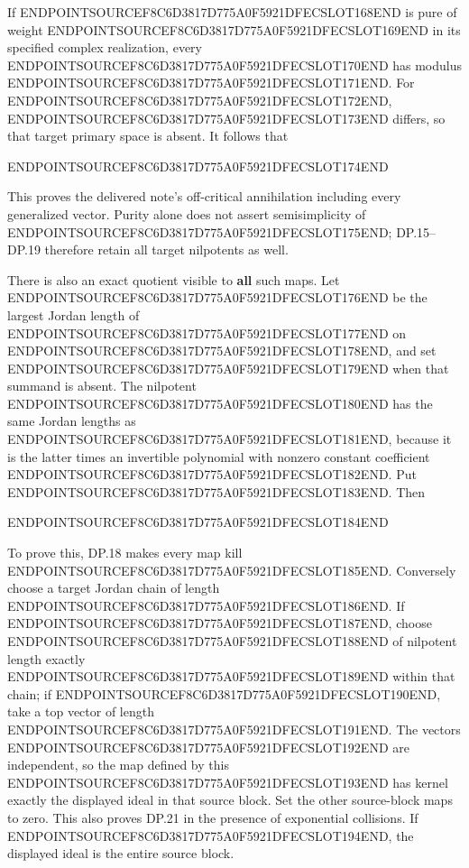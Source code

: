 If ENDPOINTSOURCEF8C6D3817D775A0F5921DFECSLOT168END is pure of weight ENDPOINTSOURCEF8C6D3817D775A0F5921DFECSLOT169END in its specified complex realization, every ENDPOINTSOURCEF8C6D3817D775A0F5921DFECSLOT170END has modulus ENDPOINTSOURCEF8C6D3817D775A0F5921DFECSLOT171END. For ENDPOINTSOURCEF8C6D3817D775A0F5921DFECSLOT172END, ENDPOINTSOURCEF8C6D3817D775A0F5921DFECSLOT173END differs, so that target primary space is absent. It follows that

ENDPOINTSOURCEF8C6D3817D775A0F5921DFECSLOT174END

This proves the delivered note's off-critical annihilation including every generalized vector. Purity alone does not assert semisimplicity of ENDPOINTSOURCEF8C6D3817D775A0F5921DFECSLOT175END; DP.15--DP.19 therefore retain all target nilpotents as well.

There is also an exact quotient visible to \textbf{all} such maps. Let ENDPOINTSOURCEF8C6D3817D775A0F5921DFECSLOT176END be the largest Jordan length of ENDPOINTSOURCEF8C6D3817D775A0F5921DFECSLOT177END on ENDPOINTSOURCEF8C6D3817D775A0F5921DFECSLOT178END, and set ENDPOINTSOURCEF8C6D3817D775A0F5921DFECSLOT179END when that summand is absent. The nilpotent ENDPOINTSOURCEF8C6D3817D775A0F5921DFECSLOT180END has the same Jordan lengths as ENDPOINTSOURCEF8C6D3817D775A0F5921DFECSLOT181END, because it is the latter times an invertible polynomial with nonzero constant coefficient ENDPOINTSOURCEF8C6D3817D775A0F5921DFECSLOT182END. Put ENDPOINTSOURCEF8C6D3817D775A0F5921DFECSLOT183END. Then

ENDPOINTSOURCEF8C6D3817D775A0F5921DFECSLOT184END

To prove this, DP.18 makes every map kill ENDPOINTSOURCEF8C6D3817D775A0F5921DFECSLOT185END. Conversely choose a target Jordan chain of length ENDPOINTSOURCEF8C6D3817D775A0F5921DFECSLOT186END. If ENDPOINTSOURCEF8C6D3817D775A0F5921DFECSLOT187END, choose ENDPOINTSOURCEF8C6D3817D775A0F5921DFECSLOT188END of nilpotent length exactly ENDPOINTSOURCEF8C6D3817D775A0F5921DFECSLOT189END within that chain; if ENDPOINTSOURCEF8C6D3817D775A0F5921DFECSLOT190END, take a top vector of length ENDPOINTSOURCEF8C6D3817D775A0F5921DFECSLOT191END. The vectors ENDPOINTSOURCEF8C6D3817D775A0F5921DFECSLOT192END are independent, so the map defined by this ENDPOINTSOURCEF8C6D3817D775A0F5921DFECSLOT193END has kernel exactly the displayed ideal in that source block. Set the other source-block maps to zero. This also proves DP.21 in the presence of exponential collisions. If ENDPOINTSOURCEF8C6D3817D775A0F5921DFECSLOT194END, the displayed ideal is the entire source block.

